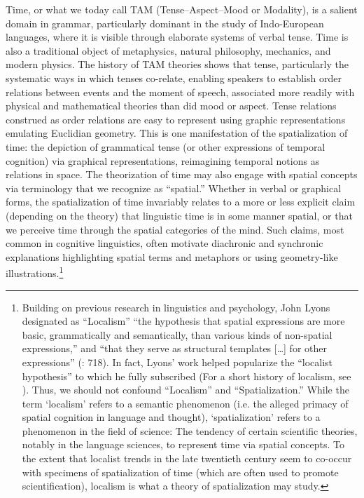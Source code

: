 \documentclass[output=paper]{langsci/langscibook}
\begin{document}
Time, or what we today call TAM (Tense–Aspect–Mood or Modality), is a salient domain in grammar, particularly dominant in the study of Indo-European languages, where it is visible through elaborate systems of verbal tense. Time is also a traditional object of metaphysics, natural philosophy, mechanics, and modern physics. The history of TAM theories shows that tense, particularly the systematic ways in which tenses co-relate, enabling speakers to establish order relations between events and the moment of speech, associated more readily with physical and mathematical theories than did mood or aspect. Tense relations construed as order relations are easy to represent using graphic representations emulating Euclidian geometry. This is one manifestation of the spatialization of time: the depiction of grammatical tense (or other expressions of temporal cognition) via graphical representations, reimagining temporal notions as relations in space. The theorization of time may also engage with spatial concepts via terminology that we recognize as “spatial.” Whether in verbal or graphical forms, the spatialization of time invariably relates to a more or less explicit claim (depending on the theory) that linguistic time is in some manner spatial, or that we perceive time through the spatial categories of the mind. Such claims, most common in cognitive linguistics, often motivate diachronic and synchronic explanations highlighting spatial terms and metaphors or using geometry-like illustrations.\footnote{Building on previous research in linguistics and psychology, John Lyons designated as “Localism” “the hypothesis that spatial expressions are more basic, grammatically and semantically, than various kinds of non-spatial expressions,” and “that they serve as structural templates […] for other expressions” (\citeyear{lyons_semantics_1977}: 718). In fact, Lyons’ work helped popularize the “localist hypothesis” to which he fully subscribed (For a short history of localism, see \citealt{bohm_andersons_2018}). Thus, we should not confound “Localism” and “Spatialization.” While the term ‘localism’ refers to a semantic phenomenon (i.e. the alleged primacy of spatial cognition in language and thought), ‘spatialization’ refers to a phenomenon in the field of science: The tendency of certain scientific theories, notably in the language sciences, to represent time via spatial concepts. To the extent that localist trends in the late twentieth century seem to co-occur with specimens of spatialization of time (which are often used to promote scientification), localism is what a theory of spatialization may study.}
\end{document}
